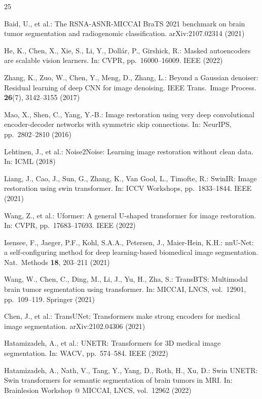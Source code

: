 \documentclass[runningheads]{llncs}
\begin{document}

\begin{thebibliography}{25}

Baid, U., et al.: The RSNA-ASNR-MICCAI BraTS 2021 benchmark on brain tumor
segmentation and radiogenomic classification. arXiv:2107.02314 (2021)

He, K., Chen, X., Xie, S., Li, Y., Doll{\'a}r, P., Girshick, R.:
Masked autoencoders are scalable vision learners.
In: CVPR, pp.~16000--16009. IEEE (2022)

Zhang, K., Zuo, W., Chen, Y., Meng, D., Zhang, L.:
Beyond a Gaussian denoiser: Residual learning of deep CNN for image denoising.
IEEE Trans.\ Image Process. \textbf{26}(7), 3142--3155 (2017)

Mao, X., Shen, C., Yang, Y.-B.:
Image restoration using very deep convolutional encoder-decoder networks
with symmetric skip connections.
In: NeurIPS, pp.~2802--2810 (2016)

Lehtinen, J., et al.: Noise2Noise: Learning image restoration without clean data.
In: ICML (2018)

Liang, J., Cao, J., Sun, G., Zhang, K., Van Gool, L., Timofte, R.:
SwinIR: Image restoration using swin transformer.
In: ICCV Workshops, pp.~1833--1844. IEEE (2021)

Wang, Z., et al.: Uformer: A general U-shaped transformer for image restoration.
In: CVPR, pp.~17683--17693. IEEE (2022)

Isensee, F., Jaeger, P.F., Kohl, S.A.A., Petersen, J., Maier-Hein, K.H.:
nnU-Net: a self-configuring method for deep learning-based biomedical
image segmentation.
Nat.\ Methods \textbf{18}, 203--211 (2021)

Wang, W., Chen, C., Ding, M., Li, J., Yu, H., Zha, S.:
TransBTS: Multimodal brain tumor segmentation using transformer.
In: MICCAI, LNCS, vol.~12901, pp.~109--119. Springer (2021)

Chen, J., et al.:
TransUNet: Transformers make strong encoders for medical image segmentation.
arXiv:2102.04306 (2021)

Hatamizadeh, A., et al.:
UNETR: Transformers for 3D medical image segmentation.
In: WACV, pp.~574--584. IEEE (2022)

Hatamizadeh, A., Nath, V., Tang, Y., Yang, D., Roth, H., Xu, D.:
Swin UNETR: Swin transformers for semantic segmentation of brain tumors in MRI.
In: Brainlesion Workshop @ MICCAI, LNCS, vol.~12962 (2022)


\end{thebibliography}
\end{document}
